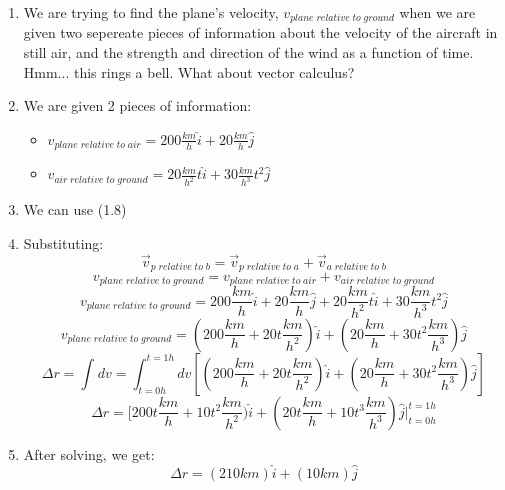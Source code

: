 \begin{solution}
\begin{enumerate}
    \item We are trying to find the plane's velocity, $v_{plane\;relative\;to\;ground}$ when we are given two sepereate pieces of information about the velocity of the aircraft in still air, and the strength and direction of the wind as a function of time. Hmm... this rings a bell. What about vector calculus?
    \item We are given 2 pieces of information:
    \begin{itemize}
        \item $v_{plane\;relative \;to \;air} = 200\frac{km}{h}\hat{i}+20\frac{km}{h}\hat{j}$
        \item $v_{air\;relative \;to \;ground} = 20\frac{km}{h^2}t\hat{i}+30\frac{km}{h^3}t^2\hat{j}$
    \end{itemize}
    \item We can use (1.8)
    \item Substituting:
    \begin{equation*}
        \vec{v}_{p\;relative\;to\;b} = 
        \vec{v}_{p\;relative\;to\;a} + \vec{v}_{a\;relative\;to\;b}
    \end{equation*}
    \begin{equation*}
        v_{plane\;relative\;to\;ground} = 
        v_{plane\;relative \;to \;air} + v_{air\;relative \;to \;ground}
    \end{equation*}
    \begin{equation*}
        v_{plane\;relative\;to\;ground} = 200\frac{km}{h}\hat{i}+20\frac{km}{h}\hat{j} +
        20\frac{km}{h^2}t\hat{i}+30\frac{km}{h^3}t^2\hat{j}
    \end{equation*}
    \begin{equation*}
        v_{plane\;relative\;to\;ground} = (200\frac{km}{h}+20t\frac{km}{h^2})\hat{i} +
        (20\frac{km}{h} +30t^2\frac{km}{h^3})\hat{j}
    \end{equation*}
    \begin{equation*}
        \Delta r = \int_{ }^{ }dv = \int_{t=0h}^{t=1h}dv
        [(200\frac{km}{h}+20t\frac{km}{h^2})\hat{i} +
        (20\frac{km}{h} +30t^2\frac{km}{h^3})\hat{j}]
    \end{equation*}
    \begin{equation*}
        \Delta r =
        [200t\frac{km}{h}+10t^2\frac{km}{h^2})\hat{i} +
        (20t\frac{km}{h} +10t^3\frac{km}{h^3})\hat{j} \Big|_{t=0h}^{t=1h}
    \end{equation*}
    \item After solving, we get:
    \begin{equation*}
        \Delta r = (210km)\hat{i}+(10km)\hat{j}
    \end{equation*}
\end{enumerate}
\end{solution}


